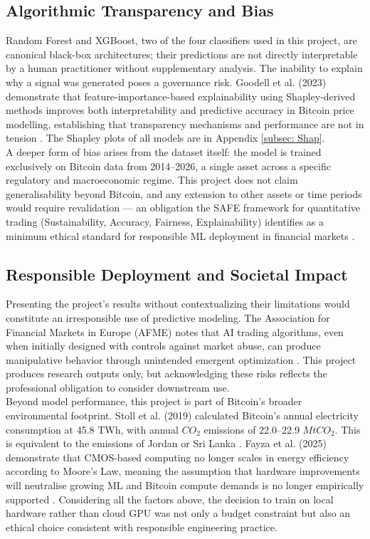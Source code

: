 \subsection{Algorithmic Transparency and Bias}
Random Forest and XGBoost, two of the four classifiers used in this project, are canonical black-box architectures; their predictions are not directly interpretable by a human practitioner without supplementary analysis. The inability to explain why a signal was generated poses a governance risk. Goodell et al. (2023) demonstrate that feature-importance-based explainability using Shapley-derived methods improves both interpretability and predictive accuracy in Bitcoin price modelling, establishing that transparency mechanisms and performance are not in tension \cite{goodellExplainableArtificialIntelligence2023}. The Shapley plots of all models are in Appendix \ref{subsec: Shap}.\\
A deeper form of bias arises from the dataset itself: the model is trained exclusively on Bitcoin data from 2014–2026, a single asset across a specific regulatory and macroeconomic regime. This project does not claim generalisability beyond Bitcoin, and any extension to other assets or time periods would require revalidation — an obligation the SAFE framework for quantitative trading (Sustainability, Accuracy, Fairness, Explainability) identifies as a minimum ethical standard for responsible ML deployment in financial markets \cite{SustainabilityAccuracyFairness}.
\subsection{Responsible Deployment and Societal Impact}
Presenting the project’s results without contextualizing their limitations would constitute an irresponsible use of predictive modeling. The Association for Financial Markets in Europe (AFME) notes that AI trading algorithms, even when initially designed with controls against market abuse, can produce manipulative behavior through unintended emergent optimization \cite{AFMEConsiderationsEthical}. This project produces research outputs only, but acknowledging these risks reflects the professional obligation to consider downstream use.\\
Beyond model performance, this project is part of Bitcoin's broader environmental footprint. Stoll et al. (2019) calculated Bitcoin's annual electricity consumption at 45.8 TWh, with annual $CO_2$ emissions of 22.0–22.9 $MtCO_2$. This is equivalent to the emissions of Jordan or Sri Lanka \cite{stollCarbonFootprintBitcoin2019}. Fayza et al. (2025) demonstrate that CMOS-based computing no longer scales in energy efficiency according to Moore's Law, meaning the assumption that hardware improvements will neutralise growing ML and Bitcoin compute demands is no longer empirically supported \cite{fayzaPhotonicsSustainableAI2025}. Considering all the factors above, the decision to train on local hardware rather than cloud GPU was not only a budget constraint but also an ethical choice consistent with responsible engineering practice.
